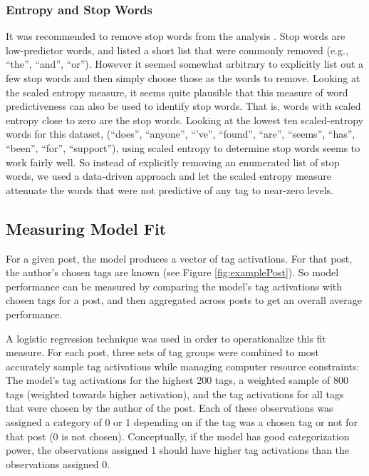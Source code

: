 \documentclass[10pt,letterpaper]{article}
\begin{document}
\subsubsection{Entropy and Stop Words}

It was recommended to remove stop words from the analysis \cite{Bird2009}.
Stop words are low-predictor words, and \citeauthor{Bird2009} listed a short list that were commonly removed (e.g., ``the'', ``and'', ``or'').
However it seemed somewhat arbitrary to explicitly list out a few stop words and then simply choose those as the words to remove.
Looking at the scaled entropy measure, it seems quite plausible that this measure of word predictiveness can also be used to identify stop words.
That is, words with scaled entropy close to zero are the stop words.
Looking at the lowest ten scaled-entropy words for this dataset, (``does'', ``anyone'', ``'ve'', ``found'', ``are'', ``seems'', ``has'', ``been'', ``for'', ``support''),
using scaled entropy to determine stop words seems to work fairly well.
So instead of explicitly removing an enumerated list of stop words, we used a data-driven approach and let the scaled entropy measure attenuate the words that were not predictive of any tag to near-zero levels.

\subsection{Measuring Model Fit}

For a given post, the model produces a vector of tag activations.
For that post, the author's chosen tags are known (see Figure \ref{fig:examplePost}).
So model performance can be measured by comparing the model's tag activations with chosen tags for a post, and then aggregated across posts to get an overall average performance.

A logistic regression technique was used in order to operationalize this fit measure.
For each post, three sets of tag groups were combined to most accurately sample tag activations while managing computer resource constraints:
The model's tag activations for the highest 200 tags, a weighted sample of 800 tags (weighted towards higher activation), and the tag activations for all tags that were chosen by the author of the post.
Each of these observations was assigned a category of 0 or 1 depending on if the tag was a chosen tag or not for that post (0 is not chosen).
Conceptually, if the model has good categorization power, the observations assigned 1 should have higher tag activations than the observations assigned 0.
\end{document}
